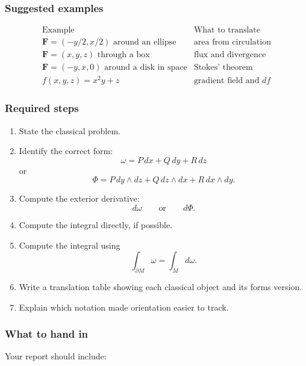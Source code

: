 \subsubsection*{Suggested examples}

\[
\begin{array}{c|c}
\text{Example} & \text{What to translate} \\ \hline
\mathbf F=(-y/2,x/2) \text{ around an ellipse}
&
\text{area from circulation}\\[1mm]
\mathbf F=(x,y,z) \text{ through a box}
&
\text{flux and divergence}\\[1mm]
\mathbf F=(-y,x,0) \text{ around a disk in space}
&
\text{Stokes' theorem}\\[1mm]
f(x,y,z)=x^2y+z
&
\text{gradient field and }df
\end{array}
\]

\subsubsection*{Required steps}

\begin{enumerate}
\item State the classical problem.

\item Identify the correct form:
\[
    \omega=P\,dx+Q\,dy+R\,dz
\]
or
\[
    \Phi=P\,dy\wedge dz+Q\,dz\wedge dx+R\,dx\wedge dy.
\]

\item Compute the exterior derivative:
\[
    d\omega
    \qquad\text{or}\qquad
    d\Phi.
\]

\item Compute the integral directly, if possible.

\item Compute the integral using
\[
    \int_{\partial M}\omega=\int_Md\omega.
\]

\item Write a translation table showing each classical object and its forms version.

\item Explain which notation made orientation easier to track.
\end{enumerate}

\subsubsection*{What to hand in}

Your report should include:

